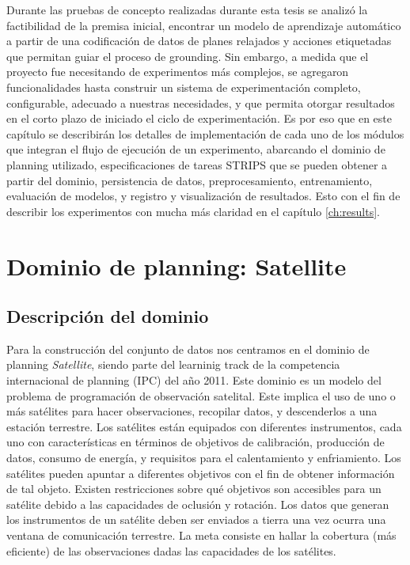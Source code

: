 Durante las pruebas de concepto realizadas durante esta tesis se analizó la
factibilidad de la premisa inicial, encontrar un modelo de aprendizaje
automático a partir de una codificación de datos de planes relajados y acciones
etiquetadas que permitan guiar el proceso de grounding. Sin embargo, a medida
que el proyecto fue necesitando de experimentos más complejos, se agregaron
funcionalidades hasta construir un sistema de experimentación completo,
configurable, adecuado a nuestras necesidades, y que permita otorgar resultados
en el corto plazo de iniciado el ciclo de experimentación. Es por eso que en
este capítulo se describirán los detalles de implementación de cada uno de los
módulos que integran el flujo de ejecución de un experimento, abarcando el
dominio de planning utilizado, especificaciones de tareas STRIPS que se pueden
obtener a partir del dominio, persistencia de datos, preprocesamiento,
entrenamiento, evaluación de modelos, y registro y visualización de resultados.
Esto con el fin de describir los experimentos con mucha más claridad en el
capítulo \ref{ch:results}.
\section{Dominio de planning: Satellite}

\subsection{Descripción del dominio}

Para la construcción del conjunto de datos nos centramos en el dominio de
planning \emph{Satellite}, siendo parte del learninig track de la competencia
internacional de planning (IPC) del año 2011. Este dominio es un modelo del
problema de programación de observación satelital. Este implica el uso de uno o
más satélites para hacer observaciones, recopilar datos, y descenderlos a una
estación terrestre. Los satélites están equipados con diferentes instrumentos,
cada uno con características en términos de objetivos de calibración, producción
de datos, consumo de energía, y requisitos para el calentamiento y enfriamiento.
Los satélites pueden apuntar a diferentes objetivos con el fin de obtener
información de tal objeto. Existen restricciones sobre qué objetivos son
accesibles para un satélite debido a las capacidades de oclusión y rotación. Los
datos que generan los instrumentos de un satélite deben ser enviados a tierra
una vez ocurra una ventana de comunicación terrestre. La meta consiste en hallar
la cobertura (más eficiente) de las observaciones dadas las capacidades de los
satélites.

